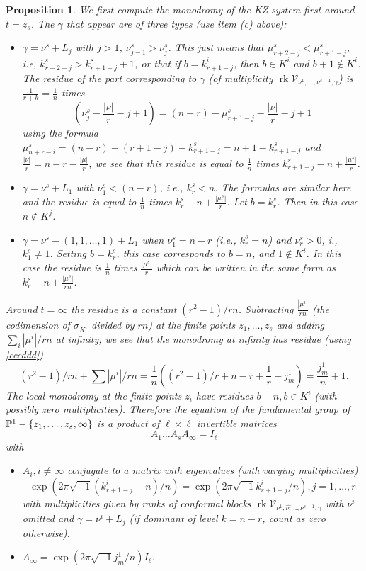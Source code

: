 \documentclass[11pt]{amsart}
\newcommand\rk{\operatorname{rk}}
\newtheorem{proposition}[theorem]{Proposition}
\numberwithin{theorem}{subsection}
\begin{document}
{\begin{proposition}
We first compute the monodromy of the KZ system first around $t=z_s$. The $\gamma$ that appear are of three types (use item (c) above):
\begin{itemize}
\item[-] $\gamma=\nu^s+L_j$ with  $j>1$, $\nu^s_{j-1}> \nu^s_j$. This just means that $\mu^s_{r+2-j}<\mu^s_{r+1-j}$,
i.e, $k^s_{r+2-j}> k^s_{r+1-j} +1$, or that if $b=k^i_{r+1-j}$, then $b\in K^i$ and $b+1\not\in K^i$. The residue of the part corresponding to $\gamma$ (of multiplicity  $\rk \mathcal{V}_{\nu^1,\dots,\nu^{s-1},\gamma}$) is $\frac{1}{r+k}=\frac{1}{n}$ times
$$(\nu^s_j -\frac{|\nu|}{r} -j +1)= (n-r)-\mu^s_{r+1-j}-\frac{|\nu|}{r} -j +1$$
using the formula $\mu^s_{n+r-i}=(n-r)+(r+1-j)-k^s_{r+1-j}=n+1-k^s_{r+1-j}$ and $\frac{|\nu|}{r}=n-r-\frac{|\mu|}{r}$, we see that this residue is equal to $\frac{1}{n}$ times $k^s_{r+1-j}-n +\frac{|\mu^s|}{r}$.
\item[-] $\gamma=\nu^s+L_1$ with $\nu^s_{1}< (n-r)$, i.e., $k^s_r<n$.  The formulas are similar here and the residue is equal to  $\frac{1}{n}$ times $k^s_{r}-n +\frac{|\mu^s|}{r}$. Let $b=k^s_r$. Then in this case $n\not\in K^j$.
\item[-] $\gamma=\nu^s -(1,1,\dots,1) +L_1$ when $\nu^s_1=n-r$ (i.e., $k^s_r=n$) and $\nu^s_r>0$, i., $k^s_1\neq 1$. Setting $b=k^s_r$, this case corresponds to $b=n$, and $1\not\in K^i$.
In this case the residue is $\frac{1}{n}$ times $\frac{|\mu^s|}{r}$ which can be written in the same form as $k^s_{r}-n +\frac{|\mu^s|}{rn}$.
\end{itemize}
Around $t=\infty$ the residue is a constant $(r^2-1)/rn$. Subtracting  $\frac{|\mu^i|}{rn}$ (the codimension of $\sigma_{K^i}$ divided by $rn$) at the finite points $z_1,\dots,z_s$ and adding $\sum_i|\mu^i|/rn$ at infinity, we see that the monodromy at infinity has residue (using \eqref{cccddd})
$$(r^2-1)/rn +\sum|\mu^i|/rn = \frac{1}{n}((r^2-1)/r +n-r+ \frac{1}{r} +j^1_m) =\frac{j^1_m}{n}+1.$$
The local monodromy at the finite points $z_i$ have residues $b-n, b\in K^i$ (with possibly zero multiplicities). Therefore the equation of the fundamental group of $\Bbb{P}^1-\{z_1,\dots,z_s,\infty\}$ is a product of $\ell\times \ell$ invertible matrices
\begin{equation}\label{KZMatrix}
A_1\dots A_s A_{\infty}=I_{\ell}
\end{equation}
with
\begin{itemize}
\item  $A_i, i\neq \infty$ conjugate to a matrix with eigenvalues (with varying multiplicities)
$$\exp(2\pi\sqrt{-1}(k^i_{r+1-j}-n)/n)= \exp(2\pi\sqrt{-1}k^i_{r+1-j}/n), j=1,\dots,r$$
with multiplicities given by  ranks of conformal blocks $\rk \mathcal{V}_{\nu^1,\widehat{\nu_i}\dots,\nu^{s-1},\gamma}$ with $\nu^i$ omitted and $\gamma=\nu^i+L_j$ (if dominant of level $k=n-r$, count as zero otherwise).
\item $A_{\infty}=\exp(2\pi\sqrt{-1}j^1_m/n)I_{\ell}$.
\end{itemize}

\end{proposition}}
\end{document}

